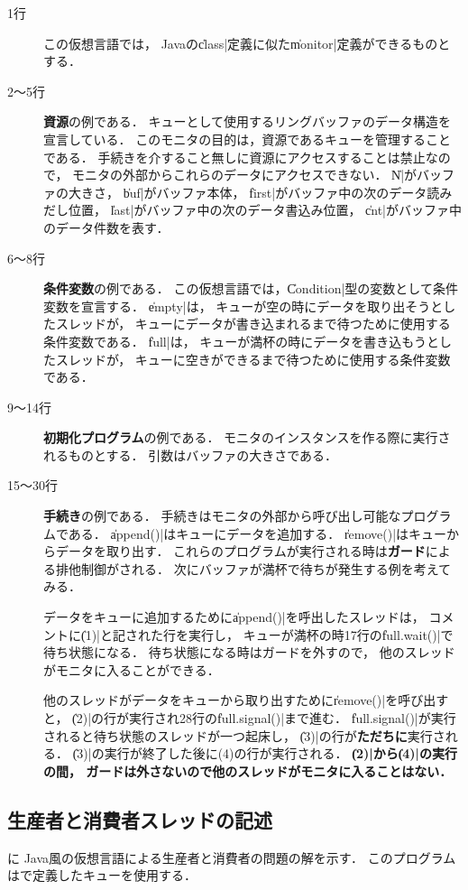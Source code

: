 \begin{description}
\item [1行] この仮想言語では，
Javaの\|class|定義に似た\|monitor|定義ができるものとする．

\item [2〜5行] {\bf 資源}の例である．
キューとして使用するリングバッファのデータ構造を宣言している．
このモニタの目的は，資源であるキューを管理することである．
手続きを介すること無しに資源にアクセスすることは禁止なので，
モニタの外部からこれらのデータにアクセスできない．
\|N|がバッファの大きさ，
\|buf|がバッファ本体，
\|first|がバッファ中の次のデータ読みだし位置，
\|last|がバッファ中の次のデータ書込み位置，
\|cnt|がバッファ中のデータ件数を表す．

\item [6〜8行] {\bf 条件変数}の例である．
この仮想言語では，\|Condition|型の変数として条件変数を宣言する．
\|empty|は，
キューが空の時にデータを取り出そうとしたスレッドが，
キューにデータが書き込まれるまで待つために使用する条件変数である．
\|full|は，
キューが満杯の時にデータを書き込もうとしたスレッドが，
キューに空きができるまで待つために使用する条件変数である．

\item [9〜14行] {\bf 初期化プログラム}の例である．
モニタのインスタンスを作る際に実行されるものとする．
引数はバッファの大きさである．

\item [15〜30行] {\bf 手続き}の例である．
手続きはモニタの外部から呼び出し可能なプログラムである．
\|append()|はキューにデータを追加する．
\|remove()|はキューからデータを取り出す．
これらのプログラムが実行される時は{\bf ガード}による排他制御がされる．
次にバッファが満杯で待ちが発生する例を考えてみる．

データをキューに追加するために\|append()|を呼出したスレッドは，
コメントに\|(1)|と記された行を実行し，
キューが満杯の時17行の\|full.wait()|で待ち状態になる．
待ち状態になる時はガードを外すので，
他のスレッドがモニタに入ることができる．

他のスレッドがデータをキューから取り出すために\|remove()|を呼び出すと，
\|(2)|の行が実行され28行の\|full.signal()|まで進む．
\|full.signal()|が実行されると待ち状態のスレッドが一つ起床し，
\|(3)|の行が{\bf ただちに}実行される．
\|(3)|の実行が終了した後に(4)の行が実行される．
{\bf \|(2)|から\|(4)|の実行の間，
ガードは外さないので他のスレッドがモニタに入ることはない．}

\end{description}

\subsection{生産者と消費者スレッドの記述}
に
Java風の仮想言語による生産者と消費者の問題の解を示す．
このプログラムはで定義したキューを使用する．

